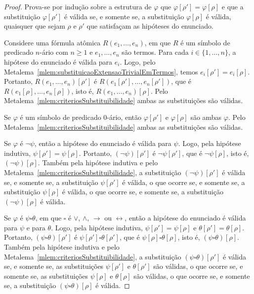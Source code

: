 \begin{proof}
    Prova-se por indução sobre a estrutura de $\varphi$ que $\varphi[\rho']=\varphi[\rho]$ e que a substituição $\varphi[\rho']$ é válida se, e somente se, a substituição $\varphi[\rho]$ é válida, quaisquer que sejam $\rho$ e $\rho'$ que satisfaçam as hipóteses do enunciado.

    Considere uma fórmula atômica $R(e_1,\dots,e_n)$, em que $R$ é um símbolo de predicado $n$-ário com $n\geq 1$ e $e_1,\dots,e_n$ são termos.
    Para cada $i\in\{1,\dots,n\}$, a hipótese do enunciado é válida para $e_i$.
    Logo, pelo Metalema~\ref{mlem:substituicaoExtensaoTrivialEmTermos}, temos $e_i[\rho']=e_i[\rho]$.
    Portanto, $R(e_1,\dots,e_n)[\rho']$ é $R(e_1[\rho'],\dots,e_n[\rho'])$, que é $R(e_1[\rho],\dots,e_n[\rho])$, isto é, $R(e_1,\dots,e_n)[\rho]$.
    Pelo Metalema~\ref{mlem:criteriosSubstituibilidade} ambas as substituições são válidas.

    Se $\varphi$ é um símbolo de predicado 0-ário, então $\varphi[\rho']$ e $\varphi[\rho]$ são ambas $\varphi$.
    Pelo Metalema~\ref{mlem:criteriosSubstituibilidade} ambas as substituições são válidas.

    Se $\varphi$ é $\neg\psi$, então a hipótese do enunciado é válida para $\psi$.
    Logo, pela hipótese indutiva, $\psi[\rho']=\psi[\rho]$.
    Portanto, $(\neg\psi)[\rho']$ é $\neg\psi[\rho']$, que é $\neg\psi[\rho]$, isto é, $(\neg\psi)[\rho]$.
    Também pela hipótese indutiva e pelo Metalema~\ref{mlem:criteriosSubstituibilidade}, a substituição $(\neg\psi)[\rho']$ é válida se, e somente se, a substituição $\psi[\rho']$ é válida, o que ocorre se, e somente se, a substituição $\psi[\rho]$ é válida, o que ocorre se, e somente se, a substituição $(\neg\psi)[\rho]$ é válida.

    Se $\varphi$ é $\psi\square\theta$, em que $\square$ é $\vee$, $\wedge$, $\rightarrow$ ou $\leftrightarrow$, então a hipótese do enunciado é válida para $\psi$ e para $\theta$.
    Logo, pela hipótese indutiva, $\psi[\rho']=\psi[\rho]$ e $\theta[\rho']=\theta[\rho]$.
    Portanto, $(\psi\square\theta)[\rho']$ é $\psi[\rho']\square\theta[\rho']$, que é $\psi[\rho]\square\theta[\rho]$, isto é, $(\psi\square\theta)[\rho]$.
    Também pela hipótese indutiva e pelo Metalema~\ref{mlem:criteriosSubstituibilidade}, a substituição $(\psi\square\theta)[\rho']$ é válida se, e somente se, as substituições $\psi[\rho']$ e $\theta[\rho']$ são válidas, o que ocorre se, e somente se, as substituições $\psi[\rho]$ e $\theta[\rho]$ são válidas, o que ocorre se, e somente se, a substituição $(\psi\square\theta)[\rho]$ é válida.


\end{proof}
